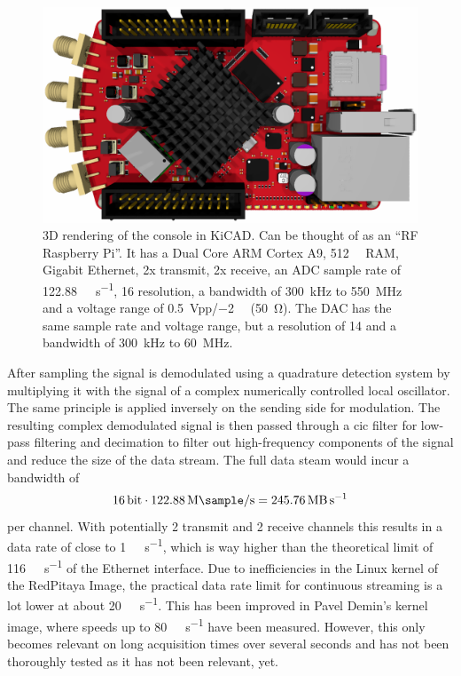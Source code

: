 \begin{figure}[hbt]
    \centering
    \includegraphics{images/rp122-16.png}
    \caption{ 3D rendering of the console in KiCAD. Can be thought of as an \enquote{RF Raspberry Pi}. It has a Dual Core ARM Cortex A9, \qty{512}{\mega\byte} RAM, Gigabit Ethernet, 2x transmit, 2x receive, an ADC sample rate of \qty{122.88}{\mega\sample\per\second}, \qty{16}{\bit} resolution, a bandwidth of \qty{300}{\kilo\hertz} to \qty{550}{\mega\hertz} and a voltage range of \qty{0.5}{Vpp}/\qty{-2}{\deci\belm} (\qty{50}{\ohm}). The DAC has the same sample rate and voltage range, but a resolution of \qty{14}{\bit} and a bandwidth of \qty{300}{\kilo\hertz} to \qty{60}{\mega\hertz}.}
\end{figure}

After sampling the signal is demodulated using a quadrature detection system by multiplying it with the signal of a complex numerically controlled local oscillator. The same principle is applied inversely on the sending side for modulation. The resulting complex demodulated signal is then passed through a \acrfull{cic} filter for low-pass filtering and decimation to filter out high-frequency components of the signal and reduce the size of the data stream. The full data steam would incur a bandwidth of
\[
    \qty{16}{\bit} \cdot \qty{122.88}{\mega\sample\per\second} = \qty{245.76}{\mega\byte\per\second}
\]
per channel. With potentially 2 transmit and 2 receive channels this results in a data rate of close to \qty{1}{\giga\byte\per\second}, which is way higher than the theoretical limit of \qty{116}{\mega\byte\per\second} of the Ethernet interface. Due to inefficiencies in the Linux kernel of the RedPitaya Image, the practical data rate limit for continuous streaming is a lot lower at about \qty{20}{\mega\sample\per\second}. This has been improved in Pavel Demin's kernel image, where speeds up to \qty{80}{\mega\byte\per\second} have been measured. However, this only becomes relevant on long acquisition times over several seconds and has not been thoroughly tested as it has not been relevant, yet.

